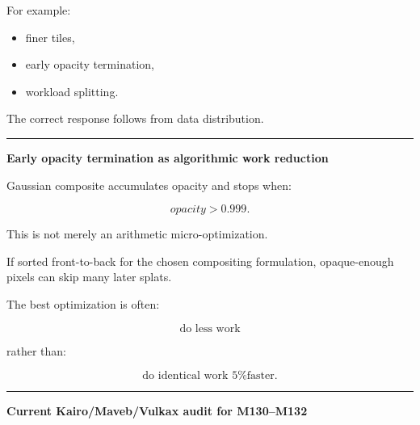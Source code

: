 For example:

\begin{itemize}
\tightlist
\item
  finer tiles,
\item
  early opacity termination,
\item
  workload splitting.
\end{itemize}

The correct response follows from data distribution.

\begin{center}\rule{0.5\linewidth}{0.5pt}\end{center}

\textbf{Early opacity termination as algorithmic work reduction}

Gaussian composite accumulates opacity and stops when:

\[
opacity>0.999.
\]

This is not merely an arithmetic micro-optimization.

If sorted front-to-back for the chosen compositing formulation, opaque-enough pixels can skip many later splats.

The best optimization is often:

\[
\boxed{
\text{do less work}
}
\]

rather than:

\[
\text{do identical work 5\% faster}.
\]

\begin{center}\rule{0.5\linewidth}{0.5pt}\end{center}

\textbf{Current Kairo/Maveb/Vulkax audit for M130--M132}


